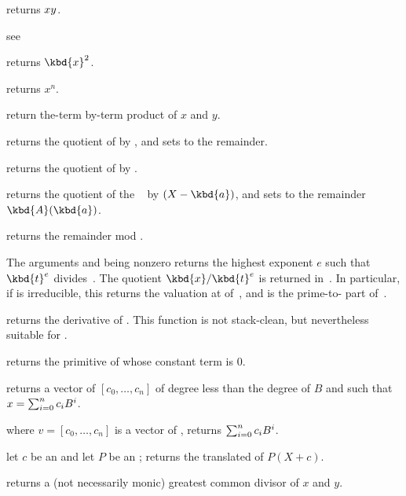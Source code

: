  returns $x\*y$.

see 

 returns $\kbd{x}^2$.

 returns $x^n$.

 return the-term by-term product of $x$
and $y$.

 returns the quotient
of  by , and sets  to the remainder.

 returns the quotient of  by
.

 returns the
quotient of the ~ by $(X - \kbd{a})$, and sets  to the
remainder $\kbd{A}(\kbd{a})$.

 returns the remainder  mod
.

 The arguments  and
 being nonzero  returns the highest exponent $e$ such that
$\kbd{t}^{e}$ divides~. The quotient $\kbd{x}/\kbd{t}^{e}$ is returned
in~. In particular, if  is irreducible, this returns the
valuation at  of~, and  is the prime-to- part
of~.

 returns the derivative of .
This function is not stack-clean, but nevertheless suitable for
.

 returns the primitive of  whose
constant term is $0$.

 returns a vector of 
$[c_0,\ldots,c_n]$ of degree less than the degree of $B$ and such that
$x=\sum_{i=0}^{n}{c_i\*B^i}$.

 where $v=[c_0,\ldots,c_n]$
is a vector of , returns $\sum_{i=0}^{n}{c_i\*B^i}$.

 let $c$ be an  and let
$P$ be an ; returns the translated  of $P(X+c)$.

 returns a (not necessarily monic)
greatest common divisor of $x$  and $y$.

